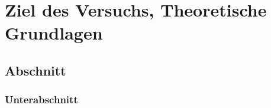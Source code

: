 \chapter{Ziel des Versuchs, Theoretische Grundlagen}
\section{Abschnitt}
\subsection{Unterabschnitt}